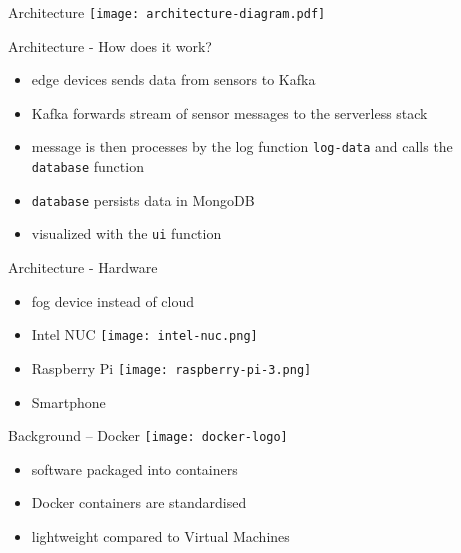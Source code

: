 \documentclass[aspectratio=169]{beamer}
\begin{document}
  \begin{frame}{Architecture}
    \centering
    \vfill
    \texttt{[image: architecture-diagram.pdf]}
  \end{frame}

  \begin{frame}{Architecture - How does it work?}
    \begin{itemize}
      \item edge devices sends data from sensors to Kafka
      \item Kafka forwards stream of sensor messages to the serverless stack
      \item message is then processes by the log function \lstinline{log-data} and calls the \lstinline{database} function
      \item \lstinline{database} persists data in MongoDB
      \item visualized with the \lstinline{ui} function
    \end{itemize}
  \end{frame}

  \begin{frame}{Architecture - Hardware}
    \begin{itemize}
      \item fog device instead of cloud
      \item Intel NUC
            \hspace*{13.5em}
            \texttt{[image: intel-nuc.png]}
      \item Raspberry Pi
            \hspace*{13.5em}
            \texttt{[image: raspberry-pi-3.png]}
      \item Smartphone
    \end{itemize}
  \end{frame}

  \begin{frame}{Background -- Docker}
    \texttt{[image: docker-logo]}

    \vspace*{1.5em}

    \begin{itemize}
      \item software packaged into containers
      \item Docker containers are standardised
      \item lightweight compared to Virtual Machines
    \end{itemize}
  \end{frame}
\end{document}
